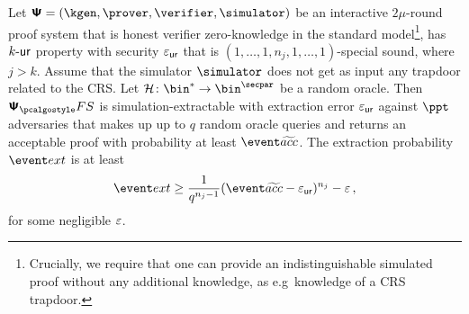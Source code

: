 \let\accentvec\vec \documentclass[runningheads,10pt]{llncs}
\begin{document}
\begin{theorem}
	\label{thm:se}
	Let $\ps = (\kgen, \prover, \verifier, \simulator)$ be an interactive $2
	\mu$-round proof system that is honest verifier zero-knowledge in the
	standard model\footnote{Crucially, we require that one can provide an
			indistinguishable simulated proof without any additional knowledge, as
	e.g~knowledge of a CRS trapdoor.}, has ${k\text{-}\mathsf{ur}}$ property with security $\varepsilon_{\mathsf{ur}}$ that is $(1, \ldots, 1, n_j, 1, \ldots, 1)$-special sound, where $j > k$.
	Assume that the simulator $\simulator$ does not get as input any trapdoor related to the CRS.
	Let $\ro\colon \bin^{*} \to \bin^{\secpar}$ be a random oracle. 
	Then $\psfs$ is simulation-extractable with extraction error $\varepsilon_{\mathsf{ur}}$ against $\ppt$ adversaries that makes up up to $q$ random oracle queries and returns an acceptable proof with probability at least $\waccProb$. 
	The extraction probability $\extProb$ is at least
	\[
		\extProb \geq \frac{1}{q^{n_j - 1}} (\waccProb - \epsur)^{n_j} -\eps\,,
	\]
	for some negligible $\varepsilon$.	
\end{theorem}
\end{document}
